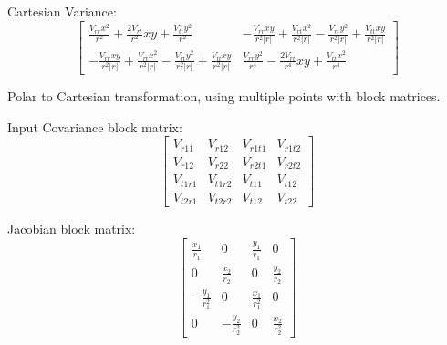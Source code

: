 \documentclass[8pt]{article}
\begin{document}
Cartesian Variance:
\begin{equation}\left[\begin{smallmatrix}\frac{V_{rr} x^{2}}{r^{2}} + \frac{2 V_{rt}}{r^{2}} x y + \frac{V_{tt} y^{2}}{r^{2}} & - \frac{V_{rr} x y}{r^{2} \left|{r}\right|} + \frac{V_{rt} x^{2}}{r^{2} \left|{r}\right|} - \frac{V_{rt} y^{2}}{r^{2} \left|{r}\right|} + \frac{V_{tt} x y}{r^{2} \left|{r}\right|}\\- \frac{V_{rr} x y}{r^{2} \left|{r}\right|} + \frac{V_{rt} x^{2}}{r^{2} \left|{r}\right|} - \frac{V_{rt} y^{2}}{r^{2} \left|{r}\right|} + \frac{V_{tt} x y}{r^{2} \left|{r}\right|} & \frac{V_{rr} y^{2}}{r^{4}} - \frac{2 V_{rt}}{r^{4}} x y + \frac{V_{tt} x^{2}}{r^{4}}\end{smallmatrix}\right]\end{equation}



Polar to Cartesian transformation, using multiple points with block matrices.

Input Covariance block matrix:
\begin{equation}\left[\begin{smallmatrix}V_{r11} & V_{r12} & V_{r1t1} & V_{r1t2}\\V_{r12} & V_{r22} & V_{r2t1} & V_{r2t2}\\V_{t1r1} & V_{t1r2} & V_{t11} & V_{t12}\\V_{t2r1} & V_{t2r2} & V_{t12} & V_{t22}\end{smallmatrix}\right]\end{equation}

Jacobian block matrix:
\begin{equation}\left[\begin{smallmatrix}\frac{x_{1}}{r_{1}} & 0 & \frac{y_{1}}{r_{1}} & 0\\0 & \frac{x_{2}}{r_{2}} & 0 & \frac{y_{2}}{r_{2}}\\- \frac{y_{1}}{r_{1}^{2}} & 0 & \frac{x_{1}}{r_{1}^{2}} & 0\\0 & - \frac{y_{2}}{r_{2}^{2}} & 0 & \frac{x_{2}
}{r_{2}^{2}}\end{smallmatrix}\right]\end{equation}
\end{document}
